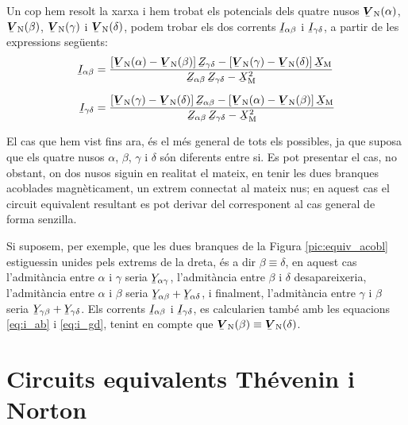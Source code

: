 Un cop hem resolt la xarxa i hem trobat els potencials dels quatre
nusos $\mcmplx{V}\ped{N}(\alpha)$, $\mcmplx{V}\ped{N}(\beta)$,
$\mcmplx{V}\ped{N}(\gamma)$ i $\mcmplx{V}\ped{N}(\delta)$, podem
trobar els dos corrents $\cmplx{I}_{\alpha\beta}$ i
$\cmplx{I}_{\gamma\delta}$, a partir de les expressions seg\"{u}ents:
\begin{subequations}
\begin{align}
    \cmplx{I}_{\alpha\beta} &=  \frac{[\mcmplx{V}\ped{N}(\alpha) - \mcmplx{V}\ped{N}(\beta)] \, \cmplx{Z}_{\gamma\delta} - [\mcmplx{V}\ped{N}(\gamma) - \mcmplx{V}\ped{N}(\delta)] \,
    \cmplx{X}\ped{M}}{\cmplx{Z}_{\alpha\beta}\,
    \cmplx{Z}_{\gamma\delta}-\cmplx{X}\ped{M}^2} \label{eq:i_ab}
    \\[1.5ex]
    \cmplx{I}_{\gamma\delta} &= \frac{[\mcmplx{V}\ped{N}(\gamma) - \mcmplx{V}\ped{N}(\delta)] \, \cmplx{Z}_{\alpha\beta} - [\mcmplx{V}\ped{N}(\alpha) - \mcmplx{V}\ped{N}(\beta)] \,
    \cmplx{X}\ped{M}}{\cmplx{Z}_{\alpha\beta}\,
    \cmplx{Z}_{\gamma\delta}-\cmplx{X}\ped{M}^2} \label{eq:i_gd}
\end{align}
\end{subequations}

El cas que hem vist fins ara, \'{e}s el m\'{e}s general de tots els
possibles, ja que suposa que els quatre nusos $\alpha$, $\beta$,
$\gamma$ i $\delta$ s\'{o}n diferents entre si. Es pot presentar el cas,
no obstant, on dos nusos siguin en realitat el mateix, en tenir les
dues branques acoblades magn\`{e}ticament, un extrem connectat al mateix
nus; en aquest cas el circuit equivalent resultant es pot derivar
del corresponent al cas general de forma senzilla.

Si suposem, per exemple, que les dues branques de la Figura
\vref{pic:equiv_acobl} estiguessin unides pels extrems de la dreta,
\'{e}s a dir $\beta\equiv\delta$, en aquest cas l'admit\`{a}ncia entre
$\alpha$ i $\gamma$ seria $\cmplx{Y}_{\alpha\gamma}$, l'admit\`{a}ncia
entre $\beta$ i $\delta$ desapareixeria, l'admit\`{a}ncia entre $\alpha$
i $\beta$ seria $\cmplx{Y}_{\alpha\beta} +
\cmplx{Y}_{\alpha\delta}$, i finalment, l'admit\`{a}ncia entre $\gamma$
i $\beta$ seria $\cmplx{Y}_{\gamma\beta} +
\cmplx{Y}_{\gamma\delta}$. Els corrents $\cmplx{I}_{\alpha\beta}$ i
$\cmplx{I}_{\gamma\delta}$, es calcularien tamb\'{e} amb les equacions
\eqref{eq:i_ab} i \eqref{eq:i_gd}, tenint en compte que
$\mcmplx{V}\ped{N}(\beta)\equiv\mcmplx{V}\ped{N}(\delta)$.

\section{Circuits equivalents Th\'{e}venin i Norton}   

